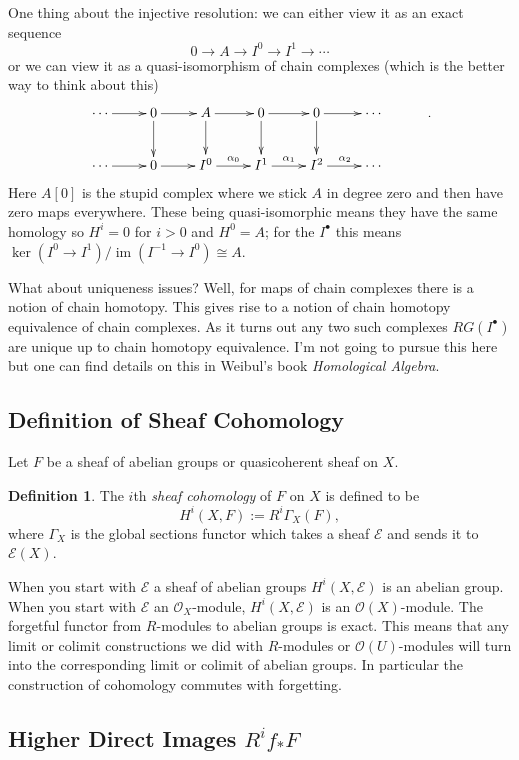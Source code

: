 \documentclass[12pt]{article}
\numberwithin{equation}{section}
\theoremstyle{definition}
\newtheorem{definition}[theorem]{Definition}
\theoremstyle{remark}
\newcommand{\Ocal}{\mathcal{O}}
\newcommand{\Ecal}{\mathcal{E}}
\newcommand{\im}{\operatorname{im}}
\begin{document}
One thing about the injective resolution: we can either view it as an exact sequence
 $$ 0 \to A \to I^0 \to I^1 \to \cdots $$
or we can view it as a quasi-isomorphism of chain complexes (which is the better way to think about this)
	$$
\xymatrix{
	\cdots \ar[r] & 0 \ar[d] \ar[r]& A \ar[d]\ar[r] & 0 \ar[r] \ar[d] & 0 \ar[d] \ar[r] & \cdots &\\
	\cdots \ar[r] & 0\ar[r]  & I^0 \ar[r]^{\alpha_0} & I^1 \ar[r]^{\alpha_1} & I^2 \ar[r]^{\alpha_2} & \cdots 
}.$$
Here $A[0]$ is the stupid complex where we stick $A$ in degree zero and then have zero maps everywhere. 
These being quasi-isomorphic means they have the same homology so $H^i=0$ for $i>0$ and $H^0=A$; for the $I^{\bullet}$ this means $\ker(I^0\to I^1)/\im(I^{-1}\to I^0) \cong A$.

What about uniqueness issues? Well, for maps of chain complexes there is a notion of chain homotopy. This gives rise to a notion of chain homotopy equivalence of chain complexes. 
As it turns out any two such complexes $RG(I^{\bullet})$ are unique up to chain homotopy equivalence.
I'm not going to pursue this here but one can find details on this in Weibul's book \emph{Homological Algebra}.

\subsection{Definition of Sheaf Cohomology}
Let $F$ be a sheaf of abelian groups or quasicoherent sheaf on $X$.
\begin{definition}
	The $i$th \emph{sheaf cohomology} of $F$ on $X$ is defined to be 
	 $$ H^i(X,F):= R^i\Gamma_X(F), $$
	 where $\Gamma_X$ is the global sections functor which takes a sheaf $\mathcal{E}$ and sends it to $\mathcal{E}(X)$.
\end{definition}

When you start with $\mathcal{E}$ a sheaf of abelian groups $H^i(X,\Ecal)$ is an abelian group. 
When you start with $\Ecal$ an $\Ocal_X$-module, $H^i(X,\Ecal)$ is an $\Ocal(X)$-module.
The forgetful functor from $R$-modules to abelian groups is exact.
This means that any limit or colimit constructions we did with $R$-modules or $\Ocal(U)$-modules will turn into the corresponding limit or colimit of abelian groups. 
In particular the construction of cohomology commutes with forgetting. 



\subsection{Higher Direct Images $R^if_*F$ }
\end{document}
